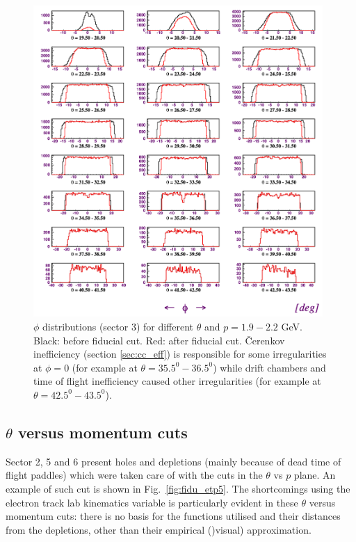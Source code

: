 \begin{figure}[ht]
    \centering
    \includegraphics[width=0.98\textwidth ]{img/electron_phis}
    \caption{$\phi$ distributions (sector 3) for different $\theta$ and
        $p=1.9-2.2$ GeV. Black: before fiducial cut. Red: after fiducial cut.
        \v Cerenkov inefficiency (section \ref{sec:cc_eff}) is responsible
        for some irregularities at $\phi = 0$ (for example at
        $\theta = 35.5^0 - 36.5^0$) while drift chambers and time of flight
        inefficiency caused other irregularities
        (for example at  $\theta = 42.5^0 - 43.5^0$).}
    \label{fig:fidu_ephis}
\end{figure}


\clearpage\newpage




\subsection{ $\theta$ versus momentum cuts}
Sector 2, 5 and 6 present holes and depletions (mainly because of dead time of flight paddles)
which were taken care of with the
cuts in the $\theta$ vs $p$ plane. An example of such cut is shown in Fig.~\ref{fig:fidu_etp5}.
The shortcomings using the electron track lab kinematics variable
is particularly evident in these  $\theta$ versus momentum cuts: there is no basis
for the functions utilised and their distances from the depletions, other than
their empirical ()visual) approximation.

